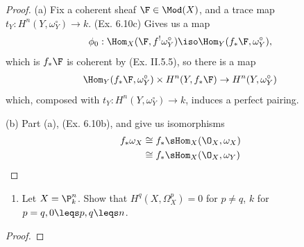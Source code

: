 \documentclass[12pt]{amsart}
\begin{document}
\begin{proof}
  (a) Fix a coherent sheaf $\F\in \Mod(X)$, and a trace map $t_Y:H^n(Y,\omega_Y^\circ)\to k$. 
  (Ex. 6.10c) Gives us a map
  \begin{align*}
    \phi_0:\Hom_X(\F,f^!\omega_Y^\circ)\iso \Hom_Y(f_*\F,\omega_Y^\circ),
  \end{align*}
  which is
  $f_*\F$ is coherent by (Ex. II.5.5), so there is a map
  \begin{align*}
    \Hom_Y(f_*\F,\omega_Y^\circ)\times H^n(Y,f_*\F)\to H^n(Y,\omega_Y^\circ)
  \end{align*}
  which, composed with $t_Y:H^n(Y,\omega_Y^\circ)\to k$, induces a perfect pairing.

  (b) Part (a), (Ex. 6.10b), and give us isomorphisms
  \begin{align*}
    f_*\omega_X&\cong f_*\sHom_X(\O_X,\omega_X) \\
               &\cong f_*\sHom_X(\O_X,\omega_Y)
  \end{align*}
\end{proof}

\begin{enumerate}
  \item[7.3.] {
      Let $X=\P_k^n$.
      Show that $H^q(X,\Omega_X^p)=0$ for $p\neq q$, $k$ for $p=q, 0\leqs p,q\leqs n$.
    }
\end{enumerate}

\begin{proof}
\end{proof}
\end{document}
